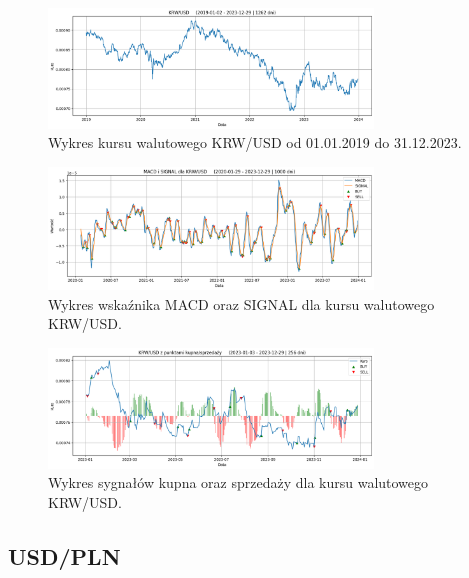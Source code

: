 \documentclass[12pt, a4paper]{article}
\begin{document}
\begin{figure}[ht]
    \centering
    \includegraphics[width=0.77\textwidth]{krw_usd_value.png}
    \caption{Wykres kursu walutowego KRW/USD od 01.01.2019 do 31.12.2023.}
    \label{fig:all:krw_usd_value}
\end{figure}
\begin{figure}[ht]
    \centering
    \includegraphics[width=0.77\textwidth]{krw_usd_macd_signal.png}
    \caption{Wykres wskaźnika MACD oraz SIGNAL dla kursu walutowego KRW/USD.}
    \label{fig:all:krw_usd_macd_signal}
\end{figure}
\begin{figure}[ht]
    \centering
    \includegraphics[width=0.77\textwidth]{krw_usd_value_buy_sell.png}
    \caption{Wykres sygnałów kupna oraz sprzedaży dla kursu walutowego KRW/USD.}
    \label{fig:all:krw_usd_value_buy_sell}
\end{figure}

\pagebreak






\subsection{USD/PLN}
\end{document}
